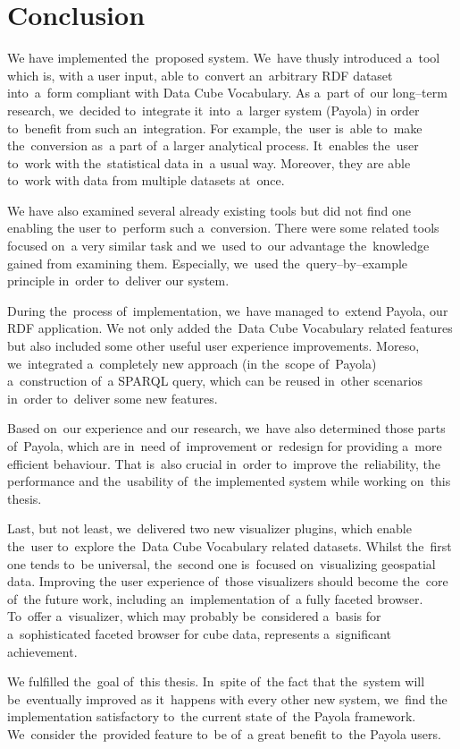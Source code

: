\chapter*{Conclusion}

We have implemented the~proposed system. We~have thusly introduced a~tool which is, with
a user input, able to~convert an~arbitrary RDF dataset into~a~form compliant with Data Cube Vocabulary.
As a~part of~our long--term research, we~decided to~integrate it~into~a~larger system (Payola)
in order to~benefit from such an~integration.
For example, the~user is~able to~make the~conversion as~a part of~a larger 
analytical process. It~enables the~user to~work with the~statistical data in~a 
usual way. Moreover, they are able to~work with data from multiple datasets at~once.

We have also examined several already existing tools but did not find one enabling
the user to~perform such a~conversion. There were some related tools 
focused on~a very similar task and we~used to~our advantage the~knowledge gained from
examining them. Especially, we~used the~query--by--example principle in~order to~deliver our system.

During the~process of~implementation, we~have managed to~extend Payola, our RDF application. 
We not only added the~Data Cube Vocabulary related features but also included some 
other useful user experience improvements. Moreso, we~integrated a~completely 
new approach (in the~scope of~Payola) a~construction of~a SPARQL query, which can 
be reused in~other scenarios in~order to~deliver some new features.

Based on~our experience and our research, we~have also determined those parts of~Payola, which are in~need of~improvement or~redesign for providing a~more 
efficient behaviour. That is~also crucial in~order to~improve the~reliability, 
the performance and the~usability of~the implemented system while working on~this 
thesis.

Last, but not least, we~delivered two new visualizer plugins, which enable the~user to~explore the~Data Cube Vocabulary related datasets. Whilst the~first one tends to~be 
universal, the~second one is~focused on~visualizing geospatial data. Improving 
the user experience of~those visualizers should become the~core of~the future work, 
including an~implementation of~a fully faceted browser. To~offer a~visualizer,
which may probably be~considered a~basis for a~sophisticated faceted browser for cube data,
represents a~significant achievement.

We fulfilled the~goal of~this thesis. In~spite of~the fact that the~system will be~eventually improved
as it~happens with every other new system, we~find
the implementation satisfactory to~the current state of~the Payola framework. We~consider the~provided feature to~be of~a great benefit to~the Payola users.
